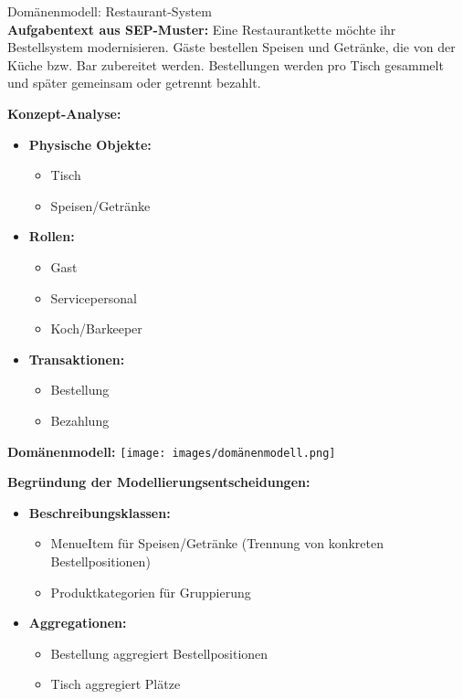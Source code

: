 \begin{example2}{Domänenmodell: Restaurant-System}\\
\textbf{Aufgabentext aus SEP-Muster:}
Eine Restaurantkette möchte ihr Bestellsystem modernisieren. Gäste bestellen Speisen und Getränke, die von der Küche bzw. Bar zubereitet werden. Bestellungen werden pro Tisch gesammelt und später gemeinsam oder getrennt bezahlt.

\textbf{Konzept-Analyse:}
\begin{itemize}
    \item \textbf{Physische Objekte:}
    \begin{itemize}
        \item Tisch
        \item Speisen/Getränke
    \end{itemize}
    
    \item \textbf{Rollen:}
    \begin{itemize}
        \item Gast
        \item Servicepersonal
        \item Koch/Barkeeper
    \end{itemize}
    
    \item \textbf{Transaktionen:}
    \begin{itemize}
        \item Bestellung
        \item Bezahlung
    \end{itemize}
\end{itemize}

\textbf{Domänenmodell:}
\texttt{[image: images/domänenmodell.png]}

\textbf{Begründung der Modellierungsentscheidungen:}
\begin{itemize}
    \item \textbf{Beschreibungsklassen:}
    \begin{itemize}
        \item MenueItem für Speisen/Getränke (Trennung von konkreten Bestellpositionen)
        \item Produktkategorien für Gruppierung
    \end{itemize}
    
    \item \textbf{Aggregationen:}
    \begin{itemize}
        \item Bestellung aggregiert Bestellpositionen
        \item Tisch aggregiert Plätze
    \end{itemize}
    

\end{itemize}
\end{example2}
